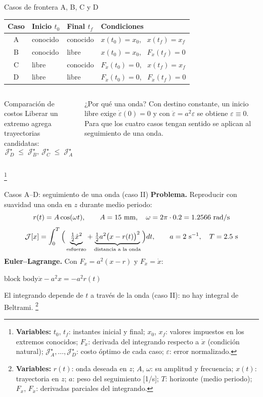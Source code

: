 \documentclass[aspectratio=169,10pt]{beamer}
\newcommand{\variables}[1]{\begingroup\renewcommand{\thefootnote}{}\footnote[frame]{\textbf{Variables:} #1}\addtocounter{footnote}{-1}\endgroup}
\newcommand{\resultado}[1]{\par\smallskip\begin{beamercolorbox}[rounded=true,sep=0.45em,center]{block body}#1\end{beamercolorbox}\par\smallskip}
\begin{document}
\begin{frame}{Casos de frontera A, B, C y D}
\centering
\small
\begin{tabular}{@{}clll@{}}
\toprule
Caso & Inicio $t_0$ & Final $t_f$ & Condiciones \\
\midrule
A & conocido & conocido & $x(t_0) = x_0$, \ $x(t_f) = x_f$ \\
B & conocido & libre & $x(t_0) = x_0$, \ $F_{\dot x}(t_f) = 0$ \\
C & libre & conocido & $F_{\dot x}(t_0) = 0$, \ $x(t_f) = x_f$ \\
D & libre & libre & $F_{\dot x}(t_0) = 0$, \ $F_{\dot x}(t_f) = 0$ \\
\bottomrule
\end{tabular}

\vspace{0.8em}
\begin{columns}[T]
\begin{block}{Comparación de costos}
Liberar un extremo agrega trayectorias candidatas:
\[
\mathcal J^\star_D \;\le\; \mathcal J^\star_B,\ \mathcal J^\star_C \;\le\; \mathcal J^\star_A
\]
\end{block}
\begin{block}{¿Por qué una onda?}
Con destino constante, un inicio libre exige $\dot\varepsilon(0) = 0$ y con $\ddot\varepsilon = a^2\varepsilon$ se obtiene $\varepsilon\equiv0$. Para que los cuatro casos tengan sentido se aplican al seguimiento de una onda.
\end{block}
\end{columns}
\variables{$t_0$, $t_f$: instantes inicial y final; $x_0$, $x_f$: valores impuestos en los extremos conocidos; $F_{\dot x}$: derivada del integrando respecto a $\dot x$ (condición natural); $\mathcal J^\star_A, \dots, \mathcal J^\star_D$: costo óptimo de cada caso; $\varepsilon$: error normalizado.}
\end{frame}

\begin{frame}{Casos A--D: seguimiento de una onda (caso II)}
\small
\textbf{Problema.} Reproducir con suavidad una onda en $z$ durante medio periodo:
\[
r(t) = A\cos(\omega t),\qquad A = \AOnda\ \text{mm},\quad \omega = 2\pi\cdot\fOnda = \wOnda\ \text{rad/s}
\]
\[
\mathcal J[x] = \int_0^T\Big(\underbrace{\tfrac12\dot x^2}_{\text{esfuerzo}} + \underbrace{\tfrac12a^2\big(x - r(t)\big)^2}_{\text{distancia a la onda}}\Big)dt,\qquad a = \aOnda\ \text{s}^{-1},\quad T = \TOnda\ \text{s}
\]
\textbf{Euler--Lagrange.} Con $F_x = a^2(x - r)$ y $F_{\dot x} = \dot x$:
\resultado{$\ddot x - a^2x = -a^2r(t)$}
El integrando depende de $t$ a través de la onda (caso II): no hay integral de Beltrami.
\variables{$r(t)$: onda deseada en $z$; $A$, $\omega$: su amplitud y frecuencia; $x(t)$: trayectoria en $z$; $a$: peso del seguimiento [1/s]; $T$: horizonte (medio periodo); $F_x$, $F_{\dot x}$: derivadas parciales del integrando.}
\end{frame}
\end{document}
